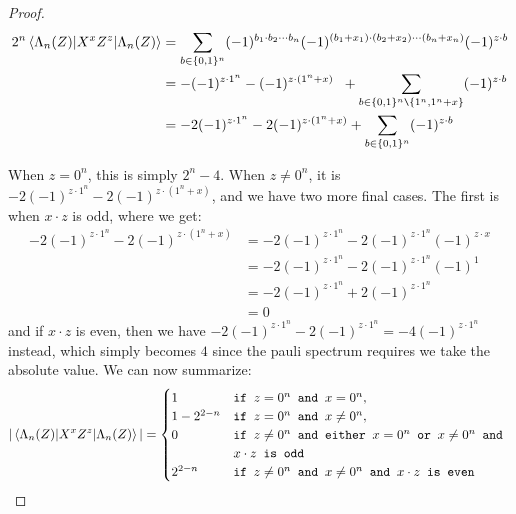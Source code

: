 \documentclass[12pt]{dalthesis}
\begin{document}
\begin{proof}
\begin{equation}
\begin{split}
2^n\braket{\Lambda_n (Z)|X^xZ^z|\Lambda_n (Z)} & = \sum\limits_{b \in \{0, 1\}^n} (-1)^{b_1 \cdot b_2 \cdots b_n} (-1)^{(b_1 + x_1) \cdot (b_2 + x_2) \cdots (b_n + x_n)} (-1)^{z \cdot b} \\
& = - (-1)^{z \cdot 1^n} - (-1)^{z \cdot (1^n + x)} \hspace{2mm} + \sum\limits_{b \in \{0, 1\}^n \texttt{\textbackslash} \{1^n, 1^n + x \} } (-1)^{z \cdot b}  \\
& = -2(-1)^{z \cdot 1^n} - 2(-1)^{z \cdot (1^n + x)} + \sum\limits_{b \in \{0, 1\}^n} (-1)^{z \cdot b}
\end{split}
\end{equation}

When $z = 0^n$, this is simply $2^n - 4$. When $z \neq 0^n$, it is $-2(-1)^{z \cdot 1^n} - 2(-1)^{z \cdot (1^n + x)}$, and we have two more final cases. The first is when $x \cdot z$ is odd, where we get:
\begin{equation}
\begin{split}
-2(-1)^{z \cdot 1^n} - 2(-1)^{z \cdot (1^n + x)} & = -2(-1)^{z \cdot 1^n} - 2(-1)^{z \cdot 1^n} (-1)^{z \cdot x} \\
& = -2(-1)^{z \cdot 1^n} - 2(-1)^{z \cdot 1^n} (-1)^1 \\
& = -2(-1)^{z \cdot 1^n} + 2(-1)^{z \cdot 1^n} \\
& = 0
\end{split}
\end{equation}
and if $x \cdot z$ is even, then we have $-2(-1)^{z \cdot 1^n} - 2(-1)^{z \cdot 1^n} = -4(-1)^{z \cdot 1^n}$ instead, which simply becomes $4$ since the pauli spectrum requires we take the absolute value. We can now summarize:
\begin{equation*}
|\braket{\Lambda_n (Z)|X^xZ^z|\Lambda_n (Z)}| = \begin{cases}
1 & \texttt{if } z = 0^n \texttt{ and } x = 0^n, \\
1 - 2^{2-n} & \texttt{if } z = 0^n \texttt{ and } x \neq 0^n, \\
0 & \texttt{if } z \neq 0^n \texttt{ and either } x = 0^n \texttt{ or } x \neq 0^n \texttt{ and } \\
& x \cdot z \texttt{ is odd} \\
2^{2-n} & \texttt{if } z \neq 0^n \texttt{ and } x \neq 0^n
 \texttt{ and } x \cdot z \texttt{ is even}
\end{cases}
\end{equation*}

\end{proof}
\end{document}
